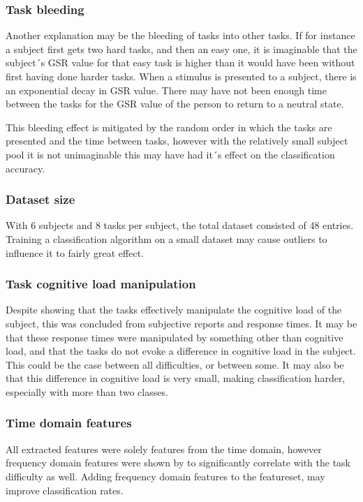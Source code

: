 \documentclass[11pt,leqno,a4paper]{report} %
\begin{document}
\subsubsection{Task bleeding}
Another explanation may be the bleeding of tasks into other tasks. If for instance a subject first gets two hard tasks, and then an easy one, it is imaginable that the subject´s GSR value for that easy task is higher than it would have been without first having done harder tasks. When a stimulus is presented to a subject, there is an exponential decay in GSR value. There may have not been enough time between the tasks for the GSR value of the person to return to a neutral state.

This bleeding effect is mitigated by the random order in which the tasks are presented and the time between tasks, however with the relatively small subject pool it is not unimaginable this may have had it´s effect on the classification accuracy.


\subsubsection{Dataset size}
With 6 subjects and 8 tasks per subject, the total dataset consisted of 48 entries. Training a classification algorithm on a small dataset may cause outliers to influence it to fairly great effect.

\subsubsection{Task cognitive load manipulation}
Despite \citet{Nourbakhsh2013} showing that the tasks effectively manipulate the cognitive load of the subject, this was concluded from subjective reports and response times. It may be that these response times were manipulated by something other than cognitive load, and that the tasks do not evoke a difference in cognitive load in the subject. This could be the case between all difficulties, or between some. It may also be that this difference in cognitive load is very small, making classification harder, especially with more than two classes.

\subsubsection{Time domain features}
All extracted features were solely features from the time domain, however frequency domain features were shown by \citep{Nourbakhsh2012} to significantly correlate with the task difficulty as well. Adding frequency domain features to the featureset, may improve classification rates.
\end{document}
